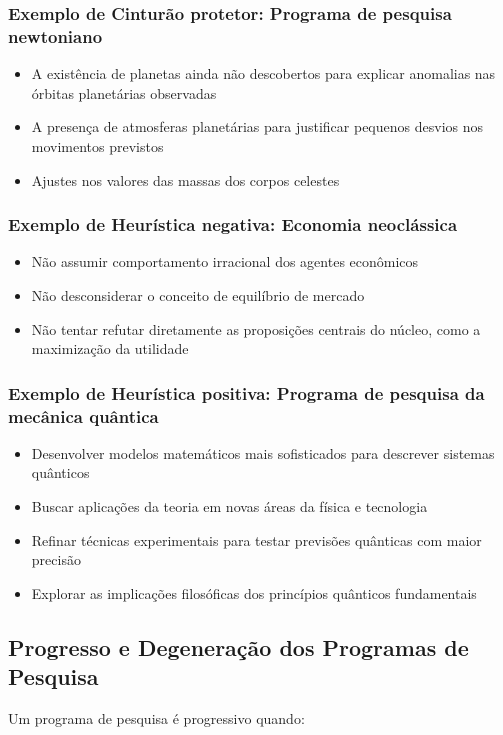 \documentclass{article} %
\begin{document}
\subsubsection{Exemplo de Cinturão protetor: Programa de pesquisa newtoniano}
\begin{itemize}
\item A existência de planetas ainda não descobertos para explicar anomalias nas órbitas planetárias observadas
\item A presença de atmosferas planetárias para justificar pequenos desvios nos movimentos previstos
\item Ajustes nos valores das massas dos corpos celestes
\end{itemize}
\subsubsection{Exemplo de Heurística negativa: Economia neoclássica}
\begin{itemize}
\item Não assumir comportamento irracional dos agentes econômicos
\item Não desconsiderar o conceito de equilíbrio de mercado
\item Não tentar refutar diretamente as proposições centrais do núcleo, como a maximização da utilidade
\end{itemize}
\subsubsection{Exemplo de Heurística positiva: Programa de pesquisa da mecânica quântica}
\begin{itemize}
\item Desenvolver modelos matemáticos mais sofisticados para descrever sistemas quânticos
\item Buscar aplicações da teoria em novas áreas da física e tecnologia
\item Refinar técnicas experimentais para testar previsões quânticas com maior precisão
\item Explorar as implicações filosóficas dos princípios quânticos fundamentais
\end{itemize}

\subsection{Progresso e Degeneração dos Programas de Pesquisa}

Um programa de pesquisa é progressivo quando:
\end{document}

